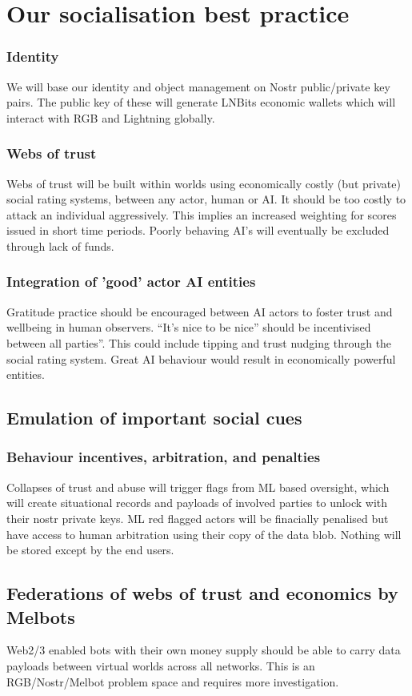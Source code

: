\section{Our socialisation best practice}
\subsubsection{Identity}
We will base our identity and object management on Nostr public/private key pairs. The public key of these will generate LNBits economic wallets which will interact with RGB and Lightning globally.
\subsubsection{Webs of trust}
Webs of trust will be built within worlds using economically costly (but private) social rating systems, between any actor, human or AI. It should be too costly to attack an individual aggressively. This implies an increased weighting for scores issued in short time periods. Poorly behaving AI's will eventually be excluded through lack of funds.
\subsubsection{Integration of 'good' actor AI entities}
Gratitude practice should be encouraged between AI actors to foster trust and wellbeing in human observers. ``It's nice to be nice'' should be incentivised between all parties''. This could include tipping and trust nudging through the social rating system. Great AI behaviour would result in economically powerful entities.
\subsection{Emulation of important social cues}
\subsubsection{Behaviour incentives, arbitration, and penalties}
Collapses of trust and abuse will trigger flags from ML based oversight, which will create situational records and payloads of involved parties to unlock with their nostr private keys. ML red flagged actors will be finacially penalised but have access to human arbitration using their copy of the data blob. Nothing will be stored except by the end users.
\subsection{Federations of webs of trust and economics by Melbots}
Web2/3 enabled bots with their own money supply should be able to carry data payloads between virtual worlds across all networks. This is an RGB/Nostr/Melbot problem space and requires more investigation. 

